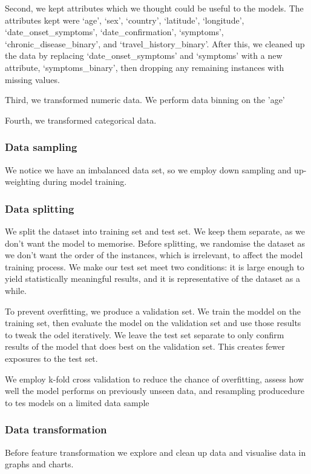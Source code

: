 \documentclass[twoside,11pt]{article}
\begin{document}
Second, we kept attributes which we thought could be useful to the models. The attributes kept were `age', `sex', `country', `latitude', `longitude', `date\_onset\_symptoms', `date\_confirmation', `symptoms', `chronic\_disease\_binary', and `travel\_history\_binary'. After this, we cleaned up the data by replacing `date\_onset\_symptoms' and `symptoms' with a new attribute, `symptoms\_binary', then dropping any remaining instances with missing values. 

Third, we transformed numeric data. We perform data binning on the 'age' 

Fourth, we transformed categorical data.

\subsubsection{Data sampling}

We notice we have an imbalanced data set, so we employ down sampling and up-weighting during model training.

\subsubsection{Data splitting}
We split the dataset into training set and test set. We keep them separate, as we don't want the model to memorise. Before splitting, we randomise the dataset as we don't want the order of the instances, which is irrelevant, to affect the model training process. We make our test set meet two conditions: it is large enough to yield statistically meaningful results, and it is representative of the dataset as a while.

To prevent overfitting, we produce a validation set. We train the moddel on the training set, then evaluate the model on the validation set and use those results to tweak the odel iteratively. We leave the test set separate to only confirm results of the model that does best on the validation set. This creates fewer exposures to the test set.

We employ k-fold cross validation to reduce the chance of overfitting, assess how well the model performs on previously unseen data, and resampling producedure to tes models on a limited data sample

\subsubsection{Data transformation}
Before feature transformation we explore and clean up data and visualise data in graphs and charts.
\end{document}
